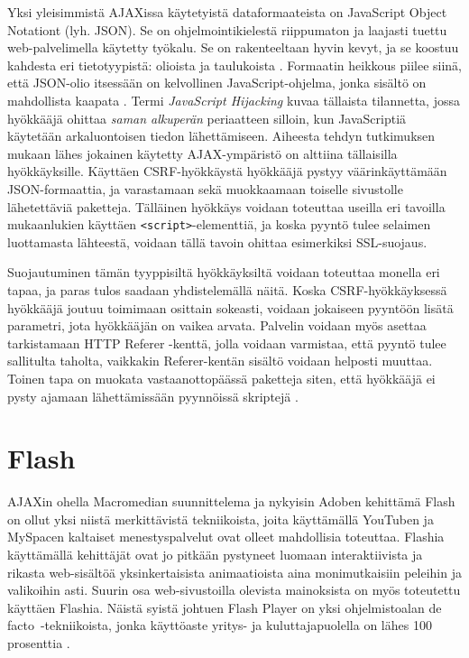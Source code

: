 Yksi yleisimmistä AJAXissa käytetyistä dataformaateista on JavaScript Object Notationt (lyh. JSON). Se on ohjelmointikielestä riippumaton ja laajasti tuettu web-palvelimella käytetty 
työkalu. Se on rakenteeltaan hyvin kevyt, ja se koostuu kahdesta eri tietotyypistä: olioista ja taulukoista \cite{JSON}. Formaatin heikkous piilee siinä, että JSON-olio itsessään on kelvollinen 
JavaScript-ohjelma, jonka sisältö on mahdollista kaapata \cite{AJAX}. Termi \emph{JavaScript Hijacking} kuvaa tällaista tilannetta, jossa hyökkääjä ohittaa \emph{saman alkuperän} periaatteen 
silloin, kun JavaScriptiä käytetään arkaluontoisen tiedon lähettämiseen. Aiheesta tehdyn tutkimuksen \cite{JSH} mukaan lähes jokainen käytetty AJAX-ympäristö on alttiina tällaisilla hyökkäyksille.
Käyttäen CSRF-hyökkäystä hyökkääjä pystyy väärinkäyttämään JSON-formaattia, ja varastamaan sekä muokkaamaan toiselle sivustolle lähetettäviä paketteja.  Tälläinen hyökkäys voidaan toteuttaa 
useilla eri tavoilla mukaanlukien käyttäen \texttt{<script>}-elementtiä, ja koska pyyntö tulee selaimen luottamasta lähteestä, voidaan tällä tavoin ohittaa esimerkiksi SSL-suojaus\cite{AJAX}.

Suojautuminen tämän tyyppisiltä hyökkäyksiltä voidaan toteuttaa monella eri tapaa, ja paras tulos saadaan yhdistelemällä näitä. Koska CSRF-hyökkäyksessä hyökkääjä joutuu toimimaan osittain 
sokeasti, voidaan jokaiseen pyyntöön lisätä parametri, jota hyökkääjän on vaikea arvata. Palvelin voidaan myös asettaa tarkistamaan HTTP Referer -kenttä, jolla voidaan varmistaa, että pyyntö 
tulee sallitulta taholta, vaikkakin Referer-kentän sisältö voidaan helposti muuttaa. Toinen tapa on muokata vastaanottopäässä paketteja siten, että hyökkääjä ei pysty ajamaan lähettämissään 
pyynnöissä skriptejä 
\cite{JSH}.

\section{Flash}

AJAXin ohella Macromedian suunnittelema ja nykyisin Adoben kehittämä Flash on ollut yksi niistä merkittävistä tekniikoista, joita käyttämällä YouTuben ja MySpacen kaltaiset 
menestyspalvelut ovat olleet mahdollisia toteuttaa. Flashia käyttämällä kehittäjät ovat jo pitkään pystyneet luomaan interaktiivista ja rikasta web-sisältöä
yksinkertaisista animaatioista aina monimutkaisiin peleihin ja valikoihin asti. Suurin osa web-sivustoilla olevista mainoksista on myös toteutettu käyttäen Flashia. Näistä syistä johtuen 
Flash Player on yksi ohjelmistoalan de facto~-tekniikoista, jonka käyttöaste yritys- ja kuluttajapuolella on lähes 100 prosenttia \cite{Flash}.

